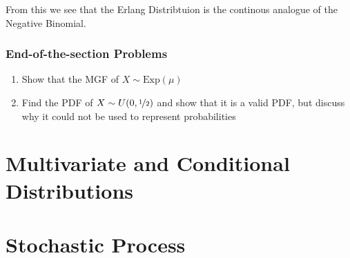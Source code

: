 \documentclass{report}
\begin{document}
From this we see that the Erlang Distribtuion is the continous analogue of the Negative Binomial.



\subsection*{End-of-the-section Problems}
\begin{enumerate}
    \item Show that the MGF of $X\sim \text{Exp}(\mu)$ \todo
    \item Find the PDF of $X\sim U(0,\nicefrac 1 2)$ and show that it is a valid PDF, but discuss why it could not be used to represent probabilities
\end{enumerate}

\chapter{Multivariate and Conditional Distributions}

\chapter{Stochastic Process}
\end{document}
